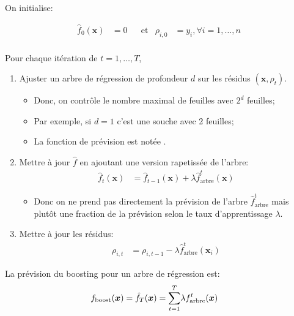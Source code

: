 \documentclass[10pt, french]{article}
\begin{document}
\begin{multicols*}{3}
\begin{algo2}
On initialise:

\begin{align*}
	\hat{f}_{0}(\bm{x})	&=	0	&
	&\text{et}	&
	\rho_{i, 0}	&=	y_{i}, \forall i = 1, \dots, n	\\
\end{align*}

Pour chaque itération de $t = 1, \dots, T$,
\begin{enumerate}[leftmargin  = *]
	\item	Ajuster un arbre de régression de profondeur $d$ sur les résidus $(\bm{x}, \rho_{t})$.
		\begin{itemize}[leftmargin = *]
		\item	Donc, on contrôle le nombre maximal de feuilles avec $2^{d}$ feuilles;
		\item	Par exemple, si $d = 1$ c'est une souche avec 2 feuilles;
		\item	La fonction de prévision est notée .
		\end{itemize}
	\item	Mettre à jour $\hat{f}$ en ajoutant une version rapetissée de l'arbre:
		\begin{align*}
		\hat{f}_{t}(\bm{x})	&=	\hat{f}_{t - 1}(\bm{x}) + \lambda \hat{f}^{t}_{\text{arbre}}(\bm{x})
		\end{align*}
		\begin{itemize}[leftmargin = *]
		\item	Donc on ne prend pas directement la prévision de l'arbre $\hat{f}^{t}_{\text{arbre}}$ mais plutôt une fraction de la prévision selon le taux d'apprentissage $\lambda$.
		\end{itemize}
	\item	Mettre à jour les résidus:
		\begin{align*}
		\rho_{i, t}	&=	\rho_{i, t - 1} - \lambda \hat{f}^{t}_{\text{arbre}}(\bm{x}_{i})	
		\end{align*}
\end{enumerate}

La prévision du boosting pour un arbre de régression est:
\begin{align*}
	f_{\text{boost}}(\bm{x})	
	&=	\hat{f}_{T}(\bm{x})
	=	\overset{T}{\underset{t = 1}{\sum}} \lambda f_{\text{arbre}}^{t}(\bm{x})	
\end{align*}
\end{algo2}

\columnbreak


\end{multicols*}
\end{document}
